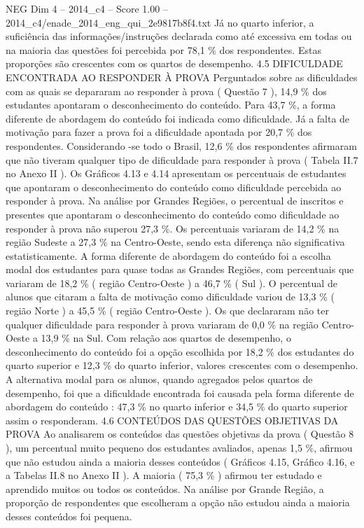 \begin{textsample}{NEG Dim 4 – 2014\_c4 – Score 1.00 – 2014\_c4/enade\_2014\_eng\_qui\_2e9817b8f4.txt}
Já no quarto inferior, a suficiência das informações/instruções declarada como até excessiva em todas ou na maioria das questões foi percebida por 78,1 \% dos respondentes.
Estas proporções são crescentes com os quartos de desempenho. 4.5 DIFICULDADE ENCONTRADA AO RESPONDER À PROVA Perguntados sobre as dificuldades com as quais se depararam ao responder à prova ( Questão 7 ), 14,9 \% dos estudantes apontaram o desconhecimento do conteúdo.
Para 43,7 \%, a forma diferente de abordagem do conteúdo foi indicada como dificuldade.
Já a falta de motivação para fazer a prova foi a dificuldade apontada por 20,7 \% dos respondentes.
Considerando -se todo o Brasil, 12,6 \% dos respondentes afirmaram que não tiveram qualquer tipo de dificuldade para responder à prova ( Tabela II.7 no Anexo II ).
Os Gráficos 4.13 e 4.14 apresentam os percentuais de estudantes que apontaram o desconhecimento do conteúdo como dificuldade percebida ao responder à prova.
Na análise por Grandes Regiões, o percentual de inscritos e presentes que apontaram o desconhecimento do conteúdo como dificuldade ao responder à prova não superou 27,3 \%.
Os percentuais variaram de 14,2 \% na região Sudeste a 27,3 \% na Centro-Oeste, sendo esta diferença não significativa estatisticamente.
A forma diferente de abordagem do conteúdo foi a escolha modal dos estudantes para quase todas as Grandes Regiões, com percentuais que variaram de 18,2 \% ( região Centro-Oeste ) a 46,7 \% ( Sul ).
O percentual de alunos que citaram a falta de motivação como dificuldade variou de 13,3 \% ( região Norte ) a 45,5 \% ( região Centro-Oeste ).
Os que declararam não ter qualquer dificuldade para responder à prova variaram de 0,0 \% na região Centro-Oeste a 13,9 \% na Sul.
Com relação aos quartos de desempenho, o desconhecimento do conteúdo foi a opção escolhida por 18,2 \% dos estudantes do quarto superior e 12,3 \% do quarto inferior, valores crescentes com o desempenho.
A alternativa modal para os alunos, quando agregados pelos quartos de desempenho, foi que a dificuldade encontrada foi causada pela forma diferente de abordagem do conteúdo : 47,3 \% no quarto inferior e 34,5 \% do quarto superior assim o responderam. 4.6 CONTEÚDOS DAS QUESTÕES OBJETIVAS DA PROVA Ao analisarem os conteúdos das questões objetivas da prova ( Questão 8 ), um percentual muito pequeno dos estudantes avaliados, apenas 1,5 \%, afirmou que não estudou ainda a maioria desses conteúdos ( Gráficos 4.15, Gráfico 4.16, e a Tabelas II.8 no Anexo II ).
A maioria ( 75,3 \% ) afirmou ter estudado e aprendido muitos ou todos os conteúdos.
Na análise por Grande Região, a proporção de respondentes que escolheram a opção não estudou ainda a maioria desses conteúdos foi pequena.

\end{textsample}
